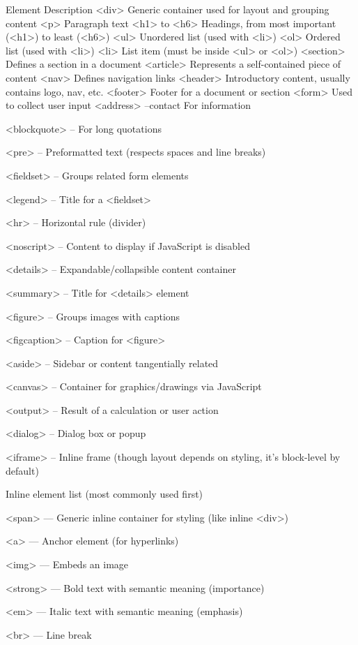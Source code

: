 Element	Description
<div>	Generic container used for layout and grouping content
<p>	Paragraph text
<h1> to <h6>	Headings, from most important (<h1>) to least (<h6>)
<ul>	Unordered list (used with <li>)
<ol>	Ordered list (used with <li>)
<li>	List item (must be inside <ul> or <ol>)
<section>	Defines a section in a document
<article>	Represents a self-contained piece of content
<nav>	Defines navigation links
<header>	Introductory content, usually contains logo, nav, etc.
<footer>	Footer for a document or section
<form>	Used to collect user input
<address> –contact For  information

<blockquote> – For long quotations

<pre> – Preformatted text (respects spaces and line breaks)

<fieldset> – Groups related form elements

<legend> – Title for a <fieldset>

<hr> – Horizontal rule (divider)

<noscript> – Content to display if JavaScript is disabled

<details> – Expandable/collapsible content container

<summary> – Title for <details> element

<figure> – Groups images with captions

<figcaption> – Caption for <figure>

<aside> – Sidebar or content tangentially related

<canvas> – Container for graphics/drawings via JavaScript

<output> – Result of a calculation or user action

<dialog> – Dialog box or popup

<iframe> – Inline frame (though layout depends on styling, it's block-level by default)





Inline element list (most commonly used first)

<span> — Generic inline container for styling (like inline <div>)

<a> — Anchor element (for hyperlinks)

<img> — Embeds an image

<strong> — Bold text with semantic meaning (importance)

<em> — Italic text with semantic meaning (emphasis)

<br> — Line break


